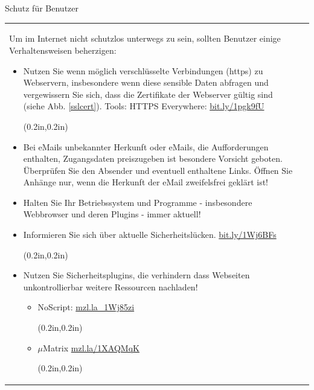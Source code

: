 \documentclass[final]{beamer}
\newcommand{\barcode}[1]{
\url{#1} \begin{pspicture}(0.2in,0.2in) 
\psbarcode[scalex=0.5,scaley=0.5]{#1}{}{qrcode} 
\end{pspicture}
}
\begin{document}
\begin{frame}[t]
\begin{columns}[t, totalwidth=\textwidth]
\end{columns} %
\begin{columns}[b]

\begin{column}{0.95\textwidth}

\begin{alertblock}{Schutz für Benutzer}
\setlength{\tabcolsep}{2cm}
\begin{tabular*}{20cm}{ ll }


\begin{minipage}[t]{0.45\linewidth}
\small {
Um im Internet nicht schutzlos unterwegs zu sein, sollten Benutzer einige Verhaltensweisen
beherzigen:

\begin{itemize}
 \item Nutzen Sie wenn möglich verschlüsselte Verbindungen (https) zu Webservern, insbesondere
 wenn diese sensible Daten abfragen und vergewissern Sie sich, dass die Zertifikate der Webserver
 gültig sind (siehe Abb. \ref{sslcert}).
 Tools: 
 HTTPS Everywhere: \barcode{bit.ly/1pgk9fU}
 
 \item Bei eMails unbekannter Herkunft oder eMails, die Aufforderungen enthalten, Zugangsdaten
 preiszugeben ist besondere Vorsicht geboten. Überprüfen Sie den Absender und eventuell enthaltene
 Links. Öffnen Sie Anhänge nur, wenn die Herkunft der eMail zweifelsfrei geklärt ist!
 
 \item Halten Sie Ihr Betriebssystem und Programme - insbesondere Webbrowser und deren Plugins - 
 immer aktuell!
 
 \item Informieren Sie sich über aktuelle Sicherheitslücken. \barcode{bit.ly/1Wj6BFs}
 
\item Nutzen Sie Sicherheitsplugins, die verhindern dass Webseiten unkontrollierbar weitere
 Ressourcen nachladen!
 \begin{itemize}
     \item NoScript: \barcode{mzl.la_1Wj85zi}
     \item $\mu{}$Matrix \barcode{mzl.la/1XAQMqK}
\end{itemize} 
 
 \end{itemize}
 } %
\end{minipage}
 &
\begin{minipage}[t]{0.45\linewidth}


\end{minipage}
\end{tabular*}
\end{alertblock}
\end{column}
\end{columns}
\end{frame}
\end{document}
